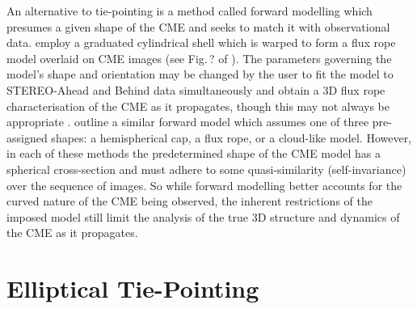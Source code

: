 \documentclass[preprint2]{aastex}
\begin{document}
\indent An alternative to tie-pointing is a method called forward modelling which presumes a given shape of the CME and seeks to match it with observational data. \citet{2006ApJ...652..763T} employ a graduated cylindrical shell which is warped to form a flux rope model overlaid on CME images (see Fig.\,? of \citet{2009SoPh..256..111T}). The parameters governing the model's shape and orientation may be changed by the user to fit the model to STEREO-Ahead and Behind data simultaneously and obtain a 3D flux rope characterisation of the CME as it propagates, though this may not always be appropriate \citep{2009ApJ...695L.171J}. \citet{2009SoPh..256..131B} outline a similar forward model which assumes one of three pre-assigned shapes: a hemispherical cap, a flux rope, or a cloud-like model. However, in each of these methods the predetermined shape of the CME model has a spherical cross-section and must adhere to some quasi-similarity (self-invariance) over the sequence of images. So while forward modelling better accounts for the curved nature of the CME being observed, the inherent restrictions of the imposed model still limit the analysis of the true 3D structure and dynamics of the CME as it propagates.



\section{Elliptical Tie-Pointing}
\label{sect:ellipticaltiepointing}
\end{document}
